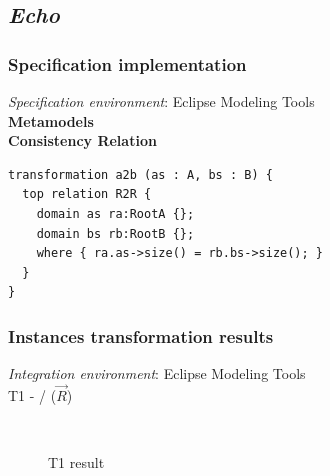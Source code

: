 \documentclass{article}
\begin{document}
\pagebreak
\subsection{\textit{Echo}}
\subsubsection{Specification implementation}
\textit{Specification environment}: Eclipse Modeling Tools
~\\

\textbf{Metamodels}
~\\

\textbf{Consistency Relation}
\begin{lstlisting}[language=QVT]
transformation a2b (as : A, bs : B) {
  top relation R2R { 
    domain as ra:RootA {};
    domain bs rb:RootB {};
    where { ra.as->size() = rb.bs->size(); }
  }
}
\end{lstlisting}


\subsubsection{Instances transformation results}
\textit{Integration environment}: Eclipse Modeling Tools
~\\

T1 -  /  ($\overrightarrow{R}$)
\begin{figure}[ht]
    \centering
    \mbox{\quad\qquad
          }
    \caption{T1 result}
    \label{fig:T1}
\end{figure}
~\\
\end{document}
